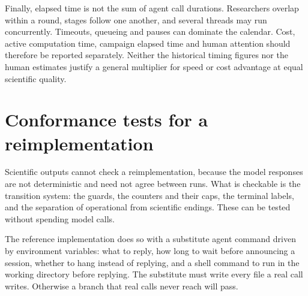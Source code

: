 \documentclass[11pt,a4paper]{article}
\begin{document}
Finally, elapsed time is not the sum of agent call durations. Researchers
overlap within a round, stages follow one another, and several threads may
run concurrently. Timeouts, queueing and pauses can dominate the calendar.
Cost, active computation time, campaign elapsed time and human attention
should therefore be reported separately. Neither the historical timing
figures nor the human estimates justify a general multiplier for speed or
cost advantage at equal scientific quality.

\section{Conformance tests for a reimplementation}
\label{app:conformance}

Scientific outputs cannot check a reimplementation, because the model responses
are not deterministic and need not agree between runs. What is checkable is the
transition system: the guards, the counters and their caps, the terminal labels,
and the separation of operational from scientific endings. These can be tested
without spending model calls.

The reference implementation does so with a substitute agent command driven by
environment variables: what to reply, how long to wait before announcing a
session, whether to hang instead of replying, and a shell command to run in the
working directory before replying. The substitute must write every file a real
call writes. Otherwise a branch that real calls never reach will pass.
\end{document}

